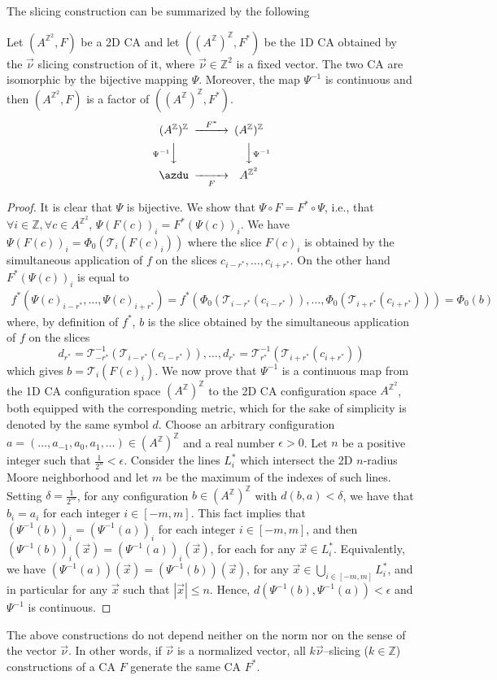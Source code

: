\documentclass{llncs}
\newcommand{\z}{\ensuremath{\mathbb{Z}}\xspace}
\newcommand{\az}{\ensuremath{A^{\mathbb{Z}}}\xspace}
\newcommand{\zdu}{\ensuremath{\mathbb{Z}^2}\xspace}
\newcommand{\azdu}{\ensuremath{A^{\zdu}}\xspace}
\newcommand{\para}[1]{(#1)}
\newcommand{\nn}{\vec\nu}
\newcommand{\T}{\ensuremath{\mathcal{T}}}
\newcommand{\xx}{\vec x}
\begin{document}
The slicing construction can be summarized by the following
\begin{theorem}\label{lem:slicingiso}
 Let $\para{\azdu, F}$ be a 2D CA and let $\para{(\az)^{\z},F^*}$ be the 1D CA
 obtained by the $\nn$ slicing construction of it, where $\nn\in\zdu$
 is a fixed vector. The two CA are isomorphic by the bijective
  mapping $\Psi$. Moreover,
  the map $\Psi^{-1}$ is continuous and then $\para{\azdu, F}$
  is a factor of $\para{(\az)^{\z},F^*}$.
\[
\begin{CD}
   (\az)^{\z}@>F^*>>&(\az)^{\z}\\
   @V{\Psi^{-1}}VV&@VV{\Psi^{-1}}V\\
   \azdu@>>F>&\azdu
\end{CD}
\]
\end{theorem}
\begin{proof}
It is clear that $\Psi$ is bijective.
We show that $\Psi\circ F=F^*\circ \Psi$, i.e., that $\forall
i\in\z, \forall c\in\azdu,\, \Psi(F(c))_i=F^*(\Psi(c))_i$. We have
$\Psi(F(c))_i=\Phi_0(\T_i(F(c)_i))$
where the slice $F(c)_i$ is obtained by the simultaneous
application of $f$ on the slices $c_{i-r^*},\ldots,c_{i+r^*}$. On
the other hand $F^*(\Psi(c))_i$ is equal to
\begin{eqnarray*}
f^*(\Psi(c)_{i-r^*}, \ldots, \Psi(c)_{i+r^*}) =
f^*(\Phi_0(\T_{i-r^*}(c_{i-r^*})),\ldots,
\Phi_0(\T_{i+r^*}(c_{i+r^*}))) =\Phi_0(b)
\end{eqnarray*}
where, by definition of $f^*$, $b$ is the slice obtained by the
simultaneous application of $f$ on the slices
\[
d_{r^*}=\T^{-1}_{-r^*}(\T_{i-r^*}(c_{i-r^*})), \ldots,
d_{r^*}=\T^{-1}_{r^*}(\T_{i+r^*}(c_{i+r^*}))
\]
which gives $b=\T_i(F(c)_i)$. We now prove that $\Psi^{-1}$ is a
continuous map from the 1D CA configuration space $(\az)^{\z}$ to
the 2D CA configuration space $\azdu$, both equipped with the
corresponding metric, which for the sake of simplicity is denoted
by the same symbol $d$. Choose an arbitrary configuration
$a=(\ldots, a_{-1}, a_0, a_{1}, \ldots)\in(\az)^{\z}$ and a real
number $\epsilon>0$. Let $n$ be a positive integer such that
$\frac{1}{2^n}<\epsilon$. Consider the lines $L^*_i$ which
intersect the 2D $n$-radius Moore neighborhood and let $m$ be the
maximum of the indexes of such lines.
Setting $\delta=\frac{1}{2^{m}}$, for any configuration
$b\in(\az)^{\z}$ with $d(b,a)<\delta$, we have that $b_i=a_i$ for
each integer $i\in[-m,m]$. This fact implies that
$(\Psi^{-1}(b))_i=(\Psi^{-1}(a))_i$ for each integer $i\in[-m,m]$,
and then $(\Psi^{-1}(b))_i(\xx)=(\Psi^{-1}(a))_i(\xx)$, for each
for any $\xx\in L^*_i$. Equivalently, we have
$(\Psi^{-1}(a))(\xx)=(\Psi^{-1}(b))(\xx)$, for any
$\xx\in\bigcup_{i\in[-m,m]} L^*_i$, and in particular for any
$\xx$ such that $|\xx|\leq n$. Hence,
$d(\Psi^{-1}(b),\Psi^{-1}(a))<\epsilon$ and $\Psi^{-1}$ is
continuous.
\end{proof}
\begin{remark}
The above constructions do not depend neither on the norm nor on
the sense of the vector $\nn$. In other words, if $\nn$ is a
normalized vector, all $k\nn$--slicing ($k\in\z$) constructions of
a CA $F$ generate the same CA $F^*$.
\end{remark}
\end{document}
